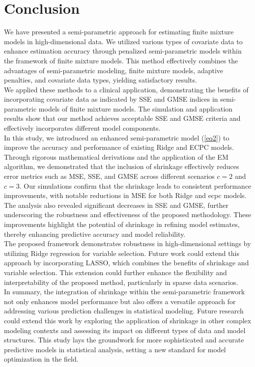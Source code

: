 \section{Conclusion} \label{sec5}
\qquad We have presented a semi-parametric approach for estimating finite mixture models in high-dimensional data. We utilized various types of covariate data to enhance estimation accuracy through penalized semi-parametric models within the framework of finite mixture models. This method effectively combines the advantages of semi-parametric modeling, finite mixture models, adaptive penalties, and covariate data types, yielding satisfactory results.\\
We applied these methods to a clinical application, demonstrating the benefits of incorporating covariate data as indicated by SSE and GMSE indices in semi-parametric models of finite mixture models. The simulation and application results show that our method achieves acceptable SSE and GMSE criteria and effectively incorporates different model components. \\
In this study, we introduced an enhanced semi-parametric model (\ref{eq2}) to improve the accuracy and performance of existing Ridge and ECPC models. Through rigorous mathematical derivations and the application of the EM algorithm, we demonstrated that the inclusion of shrinkage effectively reduces error metrics such as MSE, SSE, and GMSE across different scenarios $ c = 2 $ and $ c = 3 $. Our simulations confirm that the shrinkage leads to consistent performance improvements, with notable reductions in MSE for both Ridge and ecpc models.\\
The analysis also revealed significant decreases in SSE and GMSE, further underscoring the robustness and effectiveness of the proposed methodology. These improvements highlight the potential of shrinkage in refining model estimates, thereby enhancing predictive accuracy and model reliability.\\
The proposed framework demonstrates robustness in high-dimensional settings by utilizing Ridge regression for variable selection. Future work could extend this approach by incorporating LASSO, which combines the benefits of shrinkage and variable selection. This extension could further enhance the flexibility and interpretability of the proposed method, particularly in sparse data scenarios.\\
In summary, the integration of shrinkage within the semi-parametric framework not only enhances model performance but also offers a versatile approach for addressing various prediction challenges in statistical modeling. Future research could extend this work by exploring the application of shrinkage in other complex modeling contexts and assessing its impact on different types of data and model structures. This study lays the groundwork for more sophisticated and accurate predictive models in statistical analysis, setting a new standard for model optimization in the field.

